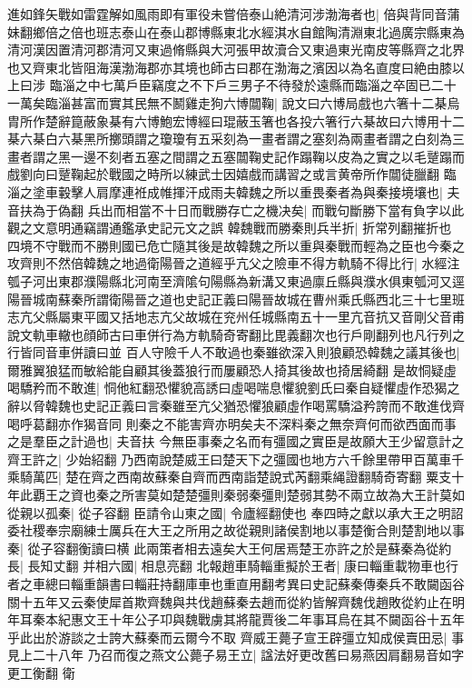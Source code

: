 進如鋒矢戰如雷霆解如風雨即有軍役未嘗倍泰山絶清河涉渤海者也|{
	倍與背同音蒲妹翻鄉倍之倍也班志泰山在泰山郡博縣東北水經淇水自館陶清淵東北過廣宗縣東為清河漢因置清河郡清河又東過脩縣與大河張甲故瀆合又東過東光南皮等縣齊之北界也又齊東北皆阻海漢渤海郡亦其境也師古曰郡在渤海之濱因以為名直度曰絶由膝以上曰涉}
臨淄之中七萬戶臣竊度之不下戶三男子不待發於遠縣而臨淄之卒固已二十一萬矣臨淄甚富而實其民無不鬭雞走狗六博闒鞠|{
	說文曰六博局戲也六箸十二棊烏胄所作楚辭箟蔽象棊有六博鮑宏博經曰琨蔽玉箸也各投六箸行六棊故曰六博用十二棊六棊白六棊黑所擲頭謂之瓊瓊有五采刻為一畫者謂之塞刻為兩畫者謂之白刻為三畫者謂之黑一邊不刻者五塞之間謂之五塞闒鞠史記作蹋鞠以皮為之實之以毛蹵蹋而戲劉向曰蹵鞠起於戰國之時所以練武士因嬉戲而講習之或言黄帝所作闒徒臘翻}
臨淄之塗車轂擊人肩摩連袵成帷揮汗成雨夫韓魏之所以重畏秦者為與秦接境壤也|{
	夫音扶為于偽翻}
兵出而相當不十日而戰勝存亡之機决矣|{
	而戰句斷勝下當有負字以此觀之文意明通竊謂通鑑承史記元文之誤}
韓魏戰而勝秦則兵半折|{
	折常列翻摧折也}
四境不守戰而不勝則國已危亡隨其後是故韓魏之所以重與秦戰而輕為之臣也今秦之攻齊則不然倍韓魏之地過衛陽晉之道經乎亢父之險車不得方軌騎不得比行|{
	水經注瓠子河出東郡濮陽縣北河南至濟隂句陽縣為新溝又東過廪丘縣與濮水俱東瓠河又逕陽晉城南蘇秦所謂衛陽晉之道也史記正義曰陽晉故城在曹州乘氏縣西北三十七里班志亢父縣屬東平國又括地志亢父故城在兖州任城縣南五十一里亢音抗又音剛父音甫說文軌車轍也顔師古曰車併行為方軌騎奇寄翻比毘義翻次也行戶剛翻列也凡行列之行皆同音車併讀曰並}
百人守險千人不敢過也秦雖欲深入則狼顧恐韓魏之議其後也|{
	爾雅翼狼猛而敏給能自顧其後蓋狼行而屢顧恐人掎其後故也掎居綺翻}
是故恫疑虛喝驕矜而不敢進|{
	恫他紅翻恐懼貌高誘曰虛喝喘息懼貌劉氏曰秦自疑懼虛作恐猲之辭以脅韓魏也史記正義曰言秦雖至亢父猶恐懼狼顧虛作喝罵驕溢矜誇而不敢進伐齊喝呼葛翻亦作猲音同}
則秦之不能害齊亦明矣夫不深料秦之無奈齊何而欲西面而事之是羣臣之計過也|{
	夫音扶}
今無臣事秦之名而有彊國之實臣是故願大王少留意計之齊王許之|{
	少始紹翻}
乃西南說楚威王曰楚天下之彊國也地方六千餘里帶甲百萬車千乘騎萬匹|{
	楚在齊之西南故蘇秦自齊而西南詣楚說式芮翻乘䋲證翻騎奇寄翻}
粟支十年此覇王之資也秦之所害莫如楚楚彊則秦弱秦彊則楚弱其勢不兩立故為大王計莫如從親以孤秦|{
	從子容翻}
臣請令山東之國|{
	令廬經翻使也}
奉四時之獻以承大王之明詔委社稷奉宗廟練士厲兵在大王之所用之故從親則諸侯割地以事楚衡合則楚割地以事秦|{
	從子容翻衡讀曰横}
此兩策者相去遠矣大王何居焉楚王亦許之於是蘇秦為從約長|{
	長知丈翻}
并相六國|{
	相息亮翻}
北報趙車騎輜重擬於王者|{
	康曰輜重載物車也行者之車總曰輜重韻書曰輜莊持翻庫車也重直用翻考異曰史記蘇秦傳秦兵不敢闚函谷關十五年又云秦使犀首欺齊魏與共伐趙蘇秦去趙而從約皆解齊魏伐趙敗從約止在明年耳秦本紀惠文王十年公子卭與魏戰虜其將龍賈後二年事耳烏在其不闚函谷十五年乎此出於游談之士誇大蘇秦而云爾今不取}
齊威王薨子宣王辟彊立知成侯賣田忌|{
	事見上二十八年}
乃召而復之燕文公薨子易王立|{
	諡法好更改舊曰易燕因肩翻易音如字更工衡翻}
衛

